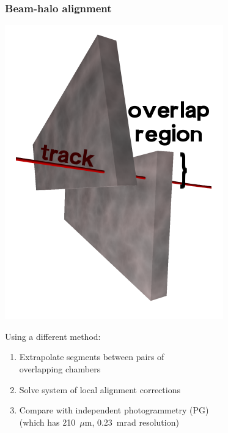 \documentclass[compress]{beamer}
\begin{document}
\begin{frame}
\frametitle{Beam-halo alignment}

\vspace{0.5 cm}
\hfill \includegraphics[width=2 cm]{overlaps.png}

\vspace{-3 cm}
Using a different method:
\begin{enumerate}
\item Extrapolate segments between pairs of \\ overlapping chambers
\item Solve system of local alignment corrections
\item Compare with independent photogrammetry (PG) \\ (which has
  210~$\mu$m, 0.23~mrad resolution)
\end{enumerate}


\end{frame}
\end{document}
